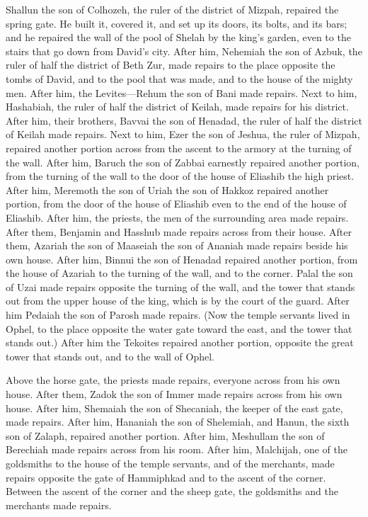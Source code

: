  Shallun the son of Colhozeh, the ruler of the district
of Mizpah, repaired the spring gate. He built it, covered it, and set up
its doors, its bolts, and its bars; and he repaired the wall of the pool
of Shelah by the king's garden, even to the stairs that go down from
David's city.  After him, Nehemiah the son of Azbuk, the
ruler of half the district of Beth Zur, made repairs to the place
opposite the tombs of David, and to the pool that was made, and to the
house of the mighty men.  After him, the Levites---Rehum
the son of Bani made repairs. Next to him, Hashabiah, the ruler of half
the district of Keilah, made repairs for his district. 
After him, their brothers, Bavvai the son of Henadad, the ruler of half
the district of Keilah made repairs.  Next to him, Ezer
the son of Jeshua, the ruler of Mizpah, repaired another portion across
from the ascent to the armory at the turning of the wall.
 After him, Baruch the son of Zabbai earnestly repaired
another portion, from the turning of the wall to the door of the house
of Eliashib the high priest.  After him, Meremoth the son
of Uriah the son of Hakkoz repaired another portion, from the door of
the house of Eliashib even to the end of the house of Eliashib.
 After him, the priests, the men of the surrounding area
made repairs.  After them, Benjamin and Hasshub made
repairs across from their house. After them, Azariah the son of Maaseiah
the son of Ananiah made repairs beside his own house. 
After him, Binnui the son of Henadad repaired another portion, from the
house of Azariah to the turning of the wall, and to the corner.
 Palal the son of Uzai made repairs opposite the turning
of the wall, and the tower that stands out from the upper house of the
king, which is by the court of the guard. After him Pedaiah the son of
Parosh made repairs.  (Now the temple servants lived in
Ophel, to the place opposite the water gate toward the east, and the
tower that stands out.)  After him the Tekoites repaired
another portion, opposite the great tower that stands out, and to the
wall of Ophel.

 Above the horse gate, the priests made repairs, everyone
across from his own house.  After them, Zadok the son of
Immer made repairs across from his own house. After him, Shemaiah the
son of Shecaniah, the keeper of the east gate, made repairs.
 After him, Hananiah the son of Shelemiah, and Hanun, the
sixth son of Zalaph, repaired another portion. After him, Meshullam the
son of Berechiah made repairs across from his room. 
After him, Malchijah, one of the goldsmiths to the house of the temple
servants, and of the merchants, made repairs opposite the gate of
Hammiphkad and to the ascent of the corner.  Between the
ascent of the corner and the sheep gate, the goldsmiths and the
merchants made repairs.

